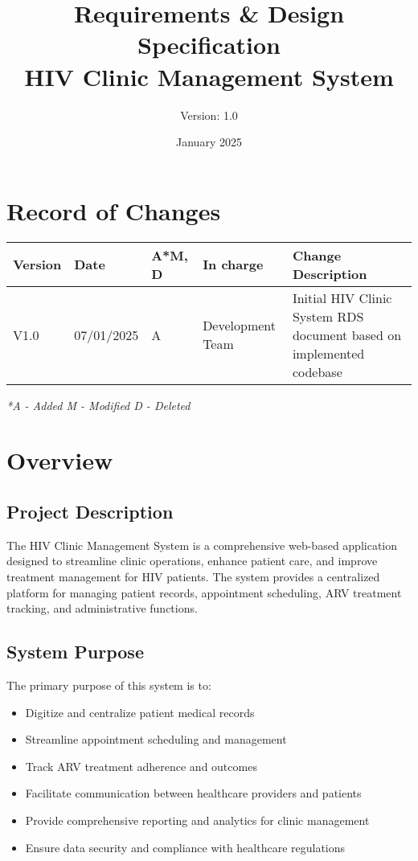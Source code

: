 \documentclass[12pt,a4paper]{article}
\title{\textbf{Requirements \& Design Specification\\HIV Clinic Management System}}
\author{Version: 1.0}
\date{January 2025}
\begin{document}
\maketitle
\thispagestyle{empty}

\newpage

\section*{Record of Changes}

\begin{longtable}{|p{2cm}|p{2cm}|p{1cm}|p{3cm}|p{6cm}|}
\hline
\textbf{Version} & \textbf{Date} & \textbf{A*M, D} & \textbf{In charge} & \textbf{Change Description} \\
\hline
V1.0 & 07/01/2025 & A & Development Team & Initial HIV Clinic System RDS document based on implemented codebase \\
\hline
\end{longtable}

\textit{*A - Added M - Modified D - Deleted}

\newpage

\tableofcontents

\newpage

\section{Overview}

\subsection{Project Description}

The HIV Clinic Management System is a comprehensive web-based application designed to streamline clinic operations, enhance patient care, and improve treatment management for HIV patients. The system provides a centralized platform for managing patient records, appointment scheduling, ARV treatment tracking, and administrative functions.

\subsection{System Purpose}

The primary purpose of this system is to:
\begin{itemize}
    \item Digitize and centralize patient medical records
    \item Streamline appointment scheduling and management
    \item Track ARV treatment adherence and outcomes
    \item Facilitate communication between healthcare providers and patients
    \item Provide comprehensive reporting and analytics for clinic management
    \item Ensure data security and compliance with healthcare regulations
\end{itemize}
\end{document}
